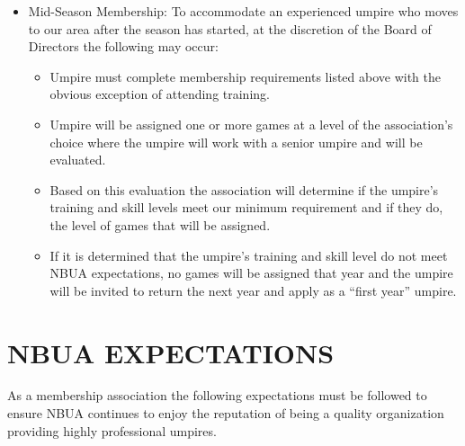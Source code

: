 \documentclass[letterpaper,11pt,colorlinks=true,allcolors=blue]{article}
\begin{document}
\begin{itemize}
\item Mid-Season Membership: To accommodate an experienced umpire who moves to our area after the season has started, at the discretion of the Board of Directors the following may occur:
\begin{itemize}
\item Umpire must complete membership requirements listed above with the obvious exception of attending training.
\item Umpire will be assigned one or more games at a level of the association’s choice where the umpire will work with a senior umpire and will be evaluated. 
\item Based on this evaluation the association will determine if the umpire’s training and skill levels meet our minimum requirement and if they do, the level of games that will be assigned.
\item If it is determined that the umpire’s training and skill level do not meet NBUA expectations, no games will be assigned that year and the umpire will be invited to return the next year and apply as a “first year” umpire. 
\end{itemize}
\end{itemize}

\newpage
\section{NBUA EXPECTATIONS}
As a membership association the following expectations must be followed to ensure NBUA continues to enjoy the reputation of being a quality organization providing highly professional umpires. 
\end{document}
